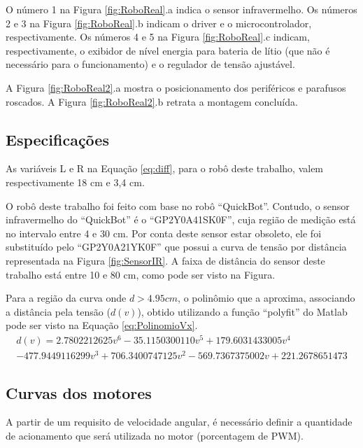 	O número 1 na Figura \ref{fig:RoboReal}.a indica o sensor infravermelho. Os números 2 e 3
	na Figura \ref{fig:RoboReal}.b indicam o driver e o microcontrolador, respectivamente.
	Os números 4 e 5 na Figura \ref{fig:RoboReal}.c indicam, respectivamente, o exibidor
	de nível energia para bateria de lítio (que não é necessário para o funcionamento) 
	e o regulador de tensão ajustável. 
	
	A Figura \ref{fig:RoboReal2}.a mostra o posicionamento dos periféricos e parafusos 
	roscados. A Figura \ref{fig:RoboReal2}.b retrata a montagem concluída.
	
	
	
\subsection{Especificações}

As variáveis L e R na Equação \ref{eq:diff}, para o robô deste trabalho, valem
respectivamente 18 cm e 3,4 cm.

O robô deste trabalho foi feito com base no robô ``QuickBot''. Contudo, o sensor infravermelho do ``QuickBot''
é o ``GP2Y0A41SK0F'', cuja região de medição está no intervalo entre 4 e 30 cm. Por conta deste sensor estar 
obsoleto, ele foi substituído pelo ``GP2Y0A21YK0F'' que possui a curva de tensão por distância representada na 
Figura \ref{fig:SensorIR}. A faixa de distância do sensor deste trabalho está entre 10 e 80 cm, como pode ser visto
na Figura. 



Para a região da curva onde $d > 4.95 cm$, o polinômio que a aproxima, associando
a distância pela tensão ($d(v)$), obtido utilizando a função ``polyfit'' do Matlab pode ser visto 
na Equação \ref{eq:PolinomioVx}.
\begin{equation}
	\label{eq:PolinomioVx}
	\begin{split}
		d(v) = 2.7802212625 v^6 -35.1150300110 v^5 + 179.6031433005 v^4 \\
		-477.9449116299 v^3 + 706.3400747125 v^2 -569.7367375002 v + 221.2678651473
	\end{split}
\end{equation}

\subsection{Curvas dos motores}

	A partir de um requisito de velocidade angular, é necessário definir a quantidade de 
	acionamento que será utilizada no motor (porcentagem de PWM).
	
